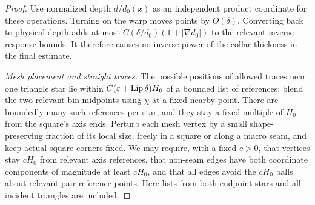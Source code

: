 \begin{proof}
Use normalized depth $d/d_0(x)$ as an independent product coordinate
for these operations.  Turning on the warp moves points by $O(\delta)$.
Converting back to physical depth adds at most
$C(\delta/d_0)(1+|\nabla d_0|)$ to the relevant inverse response
bounds.  It therefore causes no inverse power of the collar thickness
in the final estimate.

\emph{Mesh placement and straight traces.}
The possible positions of allowed traces near one triangle star lie
within $C(\varepsilon+\operatorname{Lip}\delta)H_0$ of a bounded list of
references: blend the two relevant bin midpoints using $\chi$ at a
fixed nearby point.  There are boundedly many such references per
star, and they stay a fixed multiple of $H_0$ from the square's axis
ends.  Perturb each mesh vertex by a small shape-preserving fraction
of its local size, freely in a square or along a macro seam, and keep
actual square corners fixed.  We may require, with a fixed $c>0$,
that vertices stay $cH_0$ from relevant axis references, that
non-seam edges have both coordinate components of magnitude at
least $cH_0$, and that all edges avoid the $cH_0$ balls about relevant
pair-reference points.  Here lists from both endpoint stars and all
incident triangles are included.


\end{proof}
